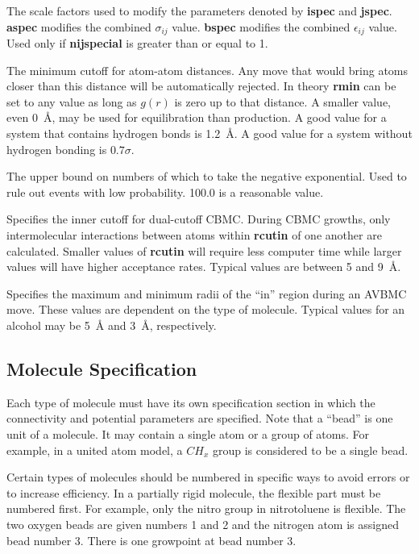 \documentclass[12pt,letterpaper]{article}
\begin{document}
 The scale factors used to modify the parameters denoted by {\textbf{ispec}} and {\textbf{jspec}}.
{\textbf{aspec}} modifies the combined $\sigma_{ij}$ value.
{\textbf{bspec}} modifies the combined $\epsilon_{ij}$ value.
Used only if {\textbf{nijspecial}} is greater than or equal to 1.

 The minimum cutoff for atom-atom distances.  Any move
that would bring atoms closer than this distance will be automatically rejected.  
In theory {\textbf{rmin}} can be set to any value as long as $g(r)$ is zero up to that distance.  
A smaller value, even 0~{\AA}, may be used for equilibration than production.
A good value for a system that contains hydrogen bonds is 1.2~{\AA}.
A good value for a system without hydrogen bonding is $0.7\sigma$.

 The upper bound on numbers of which to take the negative exponential.  
Used to rule out events with low probability.
100.0 is a reasonable value.

 Specifies the inner cutoff for dual-cutoff CBMC.
During CBMC growths, only intermolecular interactions between atoms within {\textbf{rcutin}}
of one another are calculated.  
Smaller values of {\textbf{rcutin}} will require less computer time
while larger values will have higher acceptance rates. 
Typical values are between 5 and 9~{\AA}. 

 Specifies the maximum and minimum radii of the
``in'' region during an AVBMC move.  
These values are dependent on the type of molecule.
Typical values for an alcohol may be 5~{\AA} and 3~{\AA}, respectively.

\subsection{Molecule Specification}
Each type of molecule must have its own specification section in which the
connectivity and potential parameters are specified.  
Note that a ``bead'' is one unit of a molecule.  It may contain a single atom or a group of atoms.  
For example, in a united atom model, a $CH_x$ group is considered to be a single bead.

\noindent Certain types of molecules should be numbered in specific ways to avoid errors or to increase efficiency.
In a partially rigid molecule, the flexible part must be numbered first.  For example, only the nitro group in nitrotoluene is flexible. 
The two oxygen beads are given numbers 1 and 2 and the nitrogen atom is assigned bead number 3.  
There is one growpoint at bead number 3.
\end{document}
